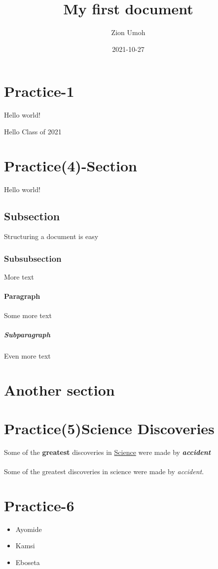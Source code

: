 \documentclass{article}
\title{My first document}
\date{2021-10-27}
\author{Zion Umoh}
\begin{document}
	\section{Practice-1}
	Hello world!
	\maketitle
	\newpage
	Hello Class of 2021
	
	\section{Practice(4)-Section}
	Hello world!
	\subsection{Subsection}
	Structuring a document is easy
	\subsubsection{Subsubsection}
	More text
	\paragraph{Paragraph}
	Some more text
	\subparagraph{Subparagraph}
	Even more text
	\section{Another section}
	
	\section{Practice(5)Science Discoveries}
	Some of the \textbf{greatest}
	discoveries in \underline{Science}
	were made by
	\textbf{\textit{accident}}
	
	\paragraph{}
	Some of the greatest discoveries in science were made by \emph{accident}.
	
	\section{Practice-6}
		\begin{itemize}
		\item Ayomide
		\item Kamsi
		\item Eboseta
	\end{itemize}
\end{document}
